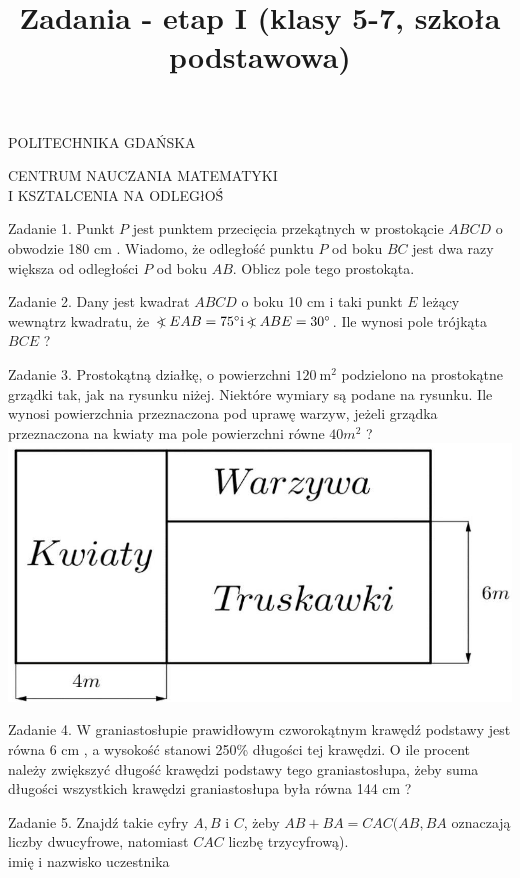 \documentclass[10pt]{article}
\title{Zadania - etap I (klasy 5-7, szkoła podstawowa) }
\author{}
\date{}
\newcommand\Varangle{\mathop{{<\!\!\!\!\!\text{\small)}}\:}\nolimits}
\begin{document}
\maketitle
POLITECHNIKA GDAŃSKA

CENTRUM NAUCZANIA MATEMATYKI\\
I KSZTALCENIA NA ODLEGłOŚ́

Zadanie 1. Punkt \(P\) jest punktem przecięcia przekątnych w prostokącie \(A B C D\) o obwodzie 180 cm . Wiadomo, że odległość punktu \(P\) od boku \(B C\) jest dwa razy większa od odległości \(P\) od boku \(A B\). Oblicz pole tego prostokąta.

Zadanie 2. Dany jest kwadrat \(A B C D\) o boku 10 cm i taki punkt \(E\) leżący wewnątrz kwadratu, że \(\Varangle E A B=75^{\circ} \mathrm{i} \Varangle A B E=30^{\circ}\). Ile wynosi pole trójkąta \(B C E\) ?

Zadanie 3. Prostokątną działkę, o powierzchni \(120 \mathrm{~m}^{2}\) podzielono na prostokątne grządki tak, jak na rysunku niżej. Niektóre wymiary są podane na rysunku. Ile wynosi powierzchnia przeznaczona pod uprawę warzyw, jeżeli grządka przeznaczona na kwiaty ma pole powierzchni równe \(40 m^{2}\) ?\\
\includegraphics[max width=\textwidth, center]{2024_11_21_0e326beee08d88391e6fg-1}

Zadanie 4. W graniastosłupie prawidłowym czworokątnym krawędź podstawy jest równa 6 cm , a wysokość stanowi 250\% długości tej krawędzi. O ile procent należy zwiększyć długość krawędzi podstawy tego graniastosłupa, żeby suma długości wszystkich krawędzi graniastosłupa była równa 144 cm ?

Zadanie 5. Znajdź takie cyfry \(A, B\) i \(C\), żeby \(A B+B A=C A C(A B, B A\) oznaczają liczby dwucyfrowe, natomiast \(C A C\) liczbę trzycyfrową).\\
imię i nazwisko uczestnika
\end{document}

